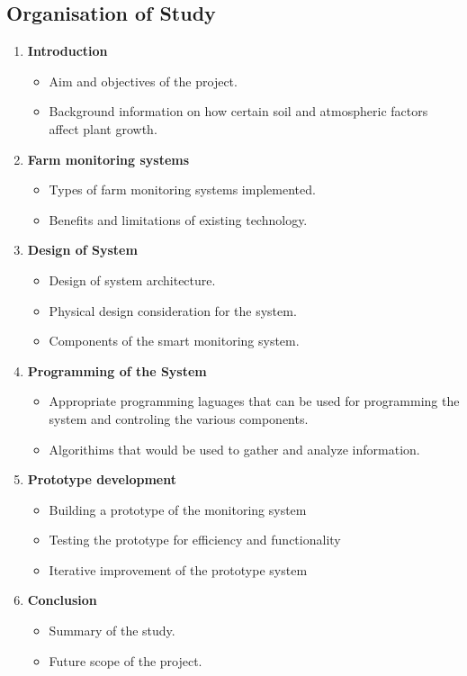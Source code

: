 \documentclass[12pt, a4paper]{article}
\begin{document}
\subsection{Organisation of Study}
\begin{enumerate}
\item \textbf{Introduction}
	\begin{itemize}
	\item[--] Aim and objectives of the project.
	\item[--] Background information on how certain soil and atmospheric factors affect plant    growth.
	\end{itemize}
\item \textbf{Farm monitoring systems}
\begin{itemize}
    \item[--] Types of farm monitoring systems implemented.
	\item[--] Benefits and limitations of existing technology.
\end{itemize}
\item \textbf{Design of System}
\begin{itemize}
	\item[--] Design of system architecture.
    \item[--] Physical design consideration for the system.
    \item[--] Components of the smart monitoring system.
\end{itemize}
\item \textbf{Programming of the System}
\begin{itemize}
	\item[--] Appropriate programming laguages that can be used for programming the system and controling the various components.
	\item[--] Algorithims that would be used to gather and analyze information.
\end{itemize}
\item \textbf{Prototype development}
\begin{itemize}
\item[--] Building a prototype of the monitoring system
\item[--] Testing the prototype for efficiency and functionality
\item[--] Iterative improvement of the prototype system
\end{itemize}
\item \textbf{Conclusion}
\begin{itemize}
\item[--] Summary of the study.
\item[--] Future scope of the project.
\end{itemize}
\end{enumerate}
\newpage
\end{document}
